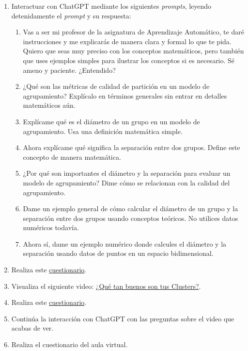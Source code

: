 \documentclass[a4,11pt]{aleph-notas}
\begin{document}
\begin{enumerate}[leftmargin=*]
    \item Interactuar con ChatGPT mediante los siguientes \textit{prompts}, leyendo detenidamente el \textit{prompt} y su respuesta:
    \begin{enumerate}[label=\textit{Prompt \arabic*.},leftmargin=2.1cm]
        \item Vas a ser mi profesor de la asignatura de Aprendizaje Automático, te daré instrucciones y me explicarás de manera clara y formal lo que te pida. Quiero que seas muy preciso con los conceptos matemáticos, pero también que uses ejemplos simples para ilustrar los conceptos si es necesario. Sé ameno y paciente. ¿Entendido?
        \item ¿Qué son las métricas de calidad de partición en un modelo de agrupamiento? Explícalo en términos generales sin entrar en detalles matemáticos aún.
        \item Explícame qué es el diámetro de un grupo en un modelo de agrupamiento. Usa una definición matemática simple.
        \item Ahora explícame qué significa la separación entre dos grupos. Define este concepto de manera matemática.
        \item ¿Por qué son importantes el diámetro y la separación para evaluar un modelo de agrupamiento? Dime cómo se relacionan con la calidad del agrupamiento.
        \item Dame un ejemplo general de cómo calcular el diámetro de un grupo y la separación entre dos grupos usando conceptos teóricos. No utilices datos numéricos todavía.
        \item Ahora sí, dame un ejemplo numérico donde calcules el diámetro y la separación usando datos de puntos en un espacio bidimensional.
    \end{enumerate}
    \item Realiza este \href{https://gemini.google.com/share/dc4bc186f73c}{cuestionario}.
    \item Visualiza el siguiente video: \href{https://youtu.be/b920s9nXGao?si=es5xjKYBKtfcdeTM}{¿Qué tan buenos son tus Clusters?}.
    \item Realiza este \href{https://gemini.google.com/share/c3d9ad6dcc77}{cuestionario}.
    \item Continúa la interacción con ChatGPT con las preguntas sobre el video que acabas de ver.
    \item Realiza el cuestionario del aula virtual.
\end{enumerate}
\end{document}
